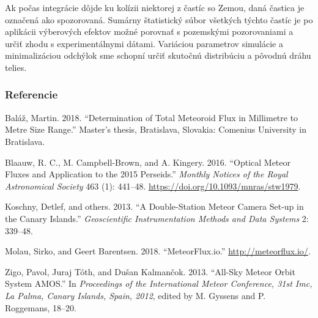 Ak počas integrácie dôjde ku kolízii niektorej z častíc so Zemou, daná
častica je označená ako spozorovaná. Sumárny štatistický súbor všetkých
týchto častíc je po aplikácii výberových efektov možné porovnať s
pozemskými pozorovaniami a určiť zhodu s experimentálnymi dátami.
Variáciou parametrov simulácie a minimalizáciou odchýlok sme schopní
určiť skutočnú distribúciu a pôvodnú dráhu telies.

\subsubsection*{Referencie}\label{referencie}

\hypertarget{refs}{}
\hypertarget{ref-balaz2018}{}
Baláž, Martin. 2018. ``Determination of Total Meteoroid Flux in
Millimetre to Metre Size Range.'' Master's thesis, Bratislava, Slovakia:
Comenius University in Bratislava.

\hypertarget{ref-blaauw2016}{}
Blaauw, R. C., M. Campbell-Brown, and A. Kingery. 2016. ``Optical Meteor
Fluxes and Application to the 2015 Perseids.'' \emph{Monthly Notices of
the Royal Astronomical Society} 463 (1): 441--48.
\url{https://doi.org/10.1093/mnras/stw1979}.

\hypertarget{ref-koschny2013}{}
Koschny, Detlef, and others. 2013. ``A Double-Station Meteor Camera
Set-up in the Canary Islands.'' \emph{Geoscientific Instrumentation
Methods and Data Systems} 2: 339--48.

\hypertarget{ref-meteorflux}{}
Molau, Sirko, and Geert Barentsen. 2018. ``MeteorFlux.io.''
\url{http://meteorflux.io/}.

\hypertarget{ref-zigo2013}{}
Zigo, Pavol, Juraj Tóth, and Dušan Kalmančok. 2013. ``All-Sky Meteor
Orbit System AMOS.'' In \emph{Proceedings of the International Meteor
Conference, 31st Imc, La Palma, Canary Islands, Spain, 2012}, edited by
M. Gyssens and P. Roggemans, 18--20.
